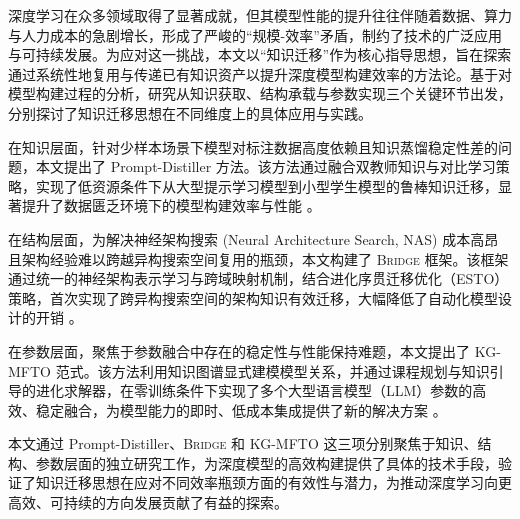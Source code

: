 \begin{cabstract}	%
	深度学习在众多领域取得了显著成就，但其模型性能的提升往往伴随着数据、算力与人力成本的急剧增长，形成了严峻的“规模-效率”矛盾，制约了技术的广泛应用与可持续发展。为应对这一挑战，本文以“知识迁移”作为核心指导思想，旨在探索通过系统性地复用与传递已有知识资产以提升深度模型构建效率的方法论。基于对模型构建过程的分析，研究从知识获取、结构承载与参数实现三个关键环节出发，分别探讨了知识迁移思想在不同维度上的具体应用与实践。

	在知识层面，针对少样本场景下模型对标注数据高度依赖且知识蒸馏稳定性差的问题，本文提出了 Prompt-Distiller 方法。该方法通过融合双教师知识与对比学习策略，实现了低资源条件下从大型提示学习模型到小型学生模型的鲁棒知识迁移，显著提升了数据匮乏环境下的模型构建效率与性能 。

	在结构层面，为解决神经架构搜索 (Neural Architecture Search, NAS) 成本高昂且架构经验难以跨越异构搜索空间复用的瓶颈，本文构建了 \textsc{Bridge} 框架。该框架通过统一的神经架构表示学习与跨域映射机制，结合进化序贯迁移优化（ESTO）策略，首次实现了跨异构搜索空间的架构知识有效迁移，大幅降低了自动化模型设计的开销 。

	在参数层面，聚焦于参数融合中存在的稳定性与性能保持难题，本文提出了 KG-MFTO 范式。该方法利用知识图谱显式建模模型关系，并通过课程规划与知识引导的进化求解器，在零训练条件下实现了多个大型语言模型（LLM）参数的高效、稳定融合，为模型能力的即时、低成本集成提供了新的解决方案 。

	本文通过 Prompt-Distiller、\textsc{Bridge} 和 KG-MFTO 这三项分别聚焦于知识、结构、参数层面的独立研究工作，为深度模型的高效构建提供了具体的技术手段，验证了知识迁移思想在应对不同效率瓶颈方面的有效性与潜力，为推动深度学习向更高效、可持续的方向发展贡献了有益的探索。
\end{cabstract}

